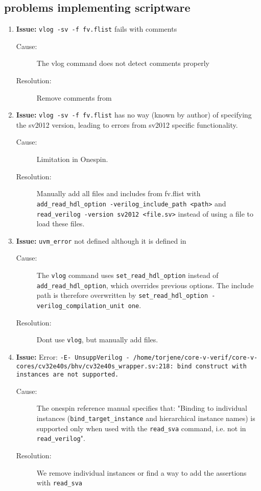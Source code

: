 \subsection{problems implementing scriptware}

\begin{enumerate}


\item \textbf{Issue:} \lstinline{vlog -sv -f fv.flist} fails with comments
  \begin{description}
    \item[Cause:] The vlog command does not detect comments properly
    \item[Resolution:] Remove comments from 
  \end{description}

\item \textbf{Issue:} \lstinline{vlog -sv -f fv.flist} has no way (known by author) of specifying the sv2012 version, leading to errors from sv2012 specific functionality.
  \begin{description}
    \item[Cause:] Limitation in Onespin. 
    \item[Resolution:] Manually add all files and includes from fv.flist with \lstinline{add_read_hdl_option -verilog_include_path <path>} and \lstinline{read_verilog -version sv2012 <file.sv>} instead of using a  file to load these files.
  \end{description}

\item \textbf{Issue:}  \lstinline{uvm_error} not defined although it is defined in 
  \begin{description}
    \item[Cause:] The \lstinline{vlog} command uses \lstinline{set_read_hdl_option} instead of  \lstinline{add_read_hdl_option}, which overrides previous options. The include path is therefore overwritten by \lstinline{set_read_hdl_option -verilog_compilation_unit one}.
    \item[Resolution:] Dont use \lstinline{vlog}, but manually add files.
  \end{description}
  
 \item \textbf{Issue:} Error: \lstinline{-E- UnsuppVerilog - /home/torjene/core-v-verif/core-v-cores/cv32e40s/bhv/cv32e40s_wrapper.sv:218: bind construct with instances are not supported.}
  \begin{description}
    \item[Cause:] The onespin reference manual specifies that: "Binding to individual instances (\lstinline{bind_target_instance} and hierarchical instance names) is supported only when used with the \lstinline{read_sva} command, i.e. not in \lstinline{read_verilog}".
    \item[Resolution:] We remove individual instances or find a way to add the assertions with \lstinline{read_sva}
  \end{description}
  

\end{enumerate}
